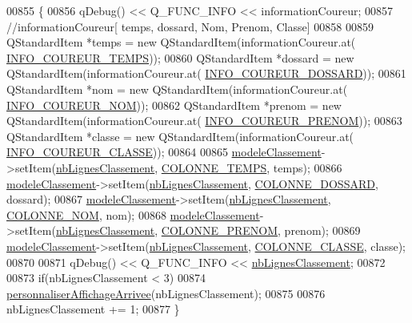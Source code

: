 \begin{DoxyCode}
00855 \{
00856     qDebug() << Q\_FUNC\_INFO << informationCoureur;
00857     \textcolor{comment}{//informationCoureur[ temps, dossard, Nom, Prenom, Classe]}
00858 
00859     QStandardItem *temps = \textcolor{keyword}{new} QStandardItem(informationCoureur.at(
      \hyperlink{ihmchronocross_8h_a156e68578bd6e6dfe628622b22b256af}{INFO\_COUREUR\_TEMPS}));
00860     QStandardItem *dossard = \textcolor{keyword}{new} QStandardItem(informationCoureur.at(
      \hyperlink{ihmchronocross_8h_a11e2b6314d0646876d7a9ef2b583a521}{INFO\_COUREUR\_DOSSARD}));
00861     QStandardItem *nom = \textcolor{keyword}{new} QStandardItem(informationCoureur.at(
      \hyperlink{ihmchronocross_8h_a71b99ea06ae916bcd158edbd441c8c24}{INFO\_COUREUR\_NOM}));
00862     QStandardItem *prenom = \textcolor{keyword}{new} QStandardItem(informationCoureur.at(
      \hyperlink{ihmchronocross_8h_a68fd2611ad0ef66da1a71726675067e7}{INFO\_COUREUR\_PRENOM}));
00863     QStandardItem *classe = \textcolor{keyword}{new} QStandardItem(informationCoureur.at(
      \hyperlink{ihmchronocross_8h_a104dfa4cfc656a690caaec36fd4d3e2d}{INFO\_COUREUR\_CLASSE}));
00864 
00865     \hyperlink{class_i_h_m_chrono_cross_ac25c95280801f36c43a1c41cf2fa253e}{modeleClassement}->setItem(\hyperlink{class_i_h_m_chrono_cross_a86ed3469ca99988211bcf0970527c119}{nbLignesClassement}, 
      \hyperlink{ihmchronocross_8h_add3424f8ad3c4224de29631acdf57899}{COLONNE\_TEMPS}, temps);
00866     \hyperlink{class_i_h_m_chrono_cross_ac25c95280801f36c43a1c41cf2fa253e}{modeleClassement}->setItem(\hyperlink{class_i_h_m_chrono_cross_a86ed3469ca99988211bcf0970527c119}{nbLignesClassement}, 
      \hyperlink{ihmchronocross_8h_a9b0cee5420830f3ca3f8561b4c1e64db}{COLONNE\_DOSSARD}, dossard);
00867     \hyperlink{class_i_h_m_chrono_cross_ac25c95280801f36c43a1c41cf2fa253e}{modeleClassement}->setItem(\hyperlink{class_i_h_m_chrono_cross_a86ed3469ca99988211bcf0970527c119}{nbLignesClassement}, 
      \hyperlink{ihmchronocross_8h_aeee76385895c145ef5a633e6c6812603}{COLONNE\_NOM}, nom);
00868     \hyperlink{class_i_h_m_chrono_cross_ac25c95280801f36c43a1c41cf2fa253e}{modeleClassement}->setItem(\hyperlink{class_i_h_m_chrono_cross_a86ed3469ca99988211bcf0970527c119}{nbLignesClassement}, 
      \hyperlink{ihmchronocross_8h_a5d6f240d26209cd66db8aa5e1aac62f9}{COLONNE\_PRENOM}, prenom);
00869     \hyperlink{class_i_h_m_chrono_cross_ac25c95280801f36c43a1c41cf2fa253e}{modeleClassement}->setItem(\hyperlink{class_i_h_m_chrono_cross_a86ed3469ca99988211bcf0970527c119}{nbLignesClassement}, 
      \hyperlink{ihmchronocross_8h_a114680edc01528f77bb689b0a2ca18a2}{COLONNE\_CLASSE}, classe);
00870 
00871     qDebug() << Q\_FUNC\_INFO << \hyperlink{class_i_h_m_chrono_cross_a86ed3469ca99988211bcf0970527c119}{nbLignesClassement};
00872 
00873     \textcolor{keywordflow}{if}(nbLignesClassement < 3)
00874         \hyperlink{class_i_h_m_chrono_cross_a41c2ff49d25069f8dfa2a7b3d0606d38}{personnaliserAffichageArrivee}(nbLignesClassement);
00875 
00876     nbLignesClassement += 1;
00877 \}
\end{DoxyCode}
